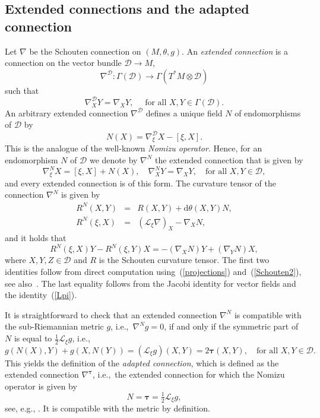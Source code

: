 \documentclass{amsart}
\theoremstyle{plain}
\theoremstyle{definition}
\newcommand{\bt}{{\boldsymbol{\tau}}}
\newcommand{\1}{\mathbf{1}}
\newcommand{\D}{{\mathcal D}}
\renewcommand{\d}{\mathrm{d}}
\renewcommand{\L}{{\mathcal L}}
\newcommand{\+}{\oplus}
\newcommand{\N}{N}
\begin{document}
\subsection{Extended connections and the adapted connection} Let $\nabla $ be the Schouten connection on $(M,\theta,g)$.
An {\it extended connection} is a connection on the vector bundle $\D\to M$, 
$$\nabla^\D:\Gamma(\D)\longrightarrow  \Gamma(T^*M\otimes \D)$$ such that $$\nabla^\D_XY=\nabla_XY,\quad  \text{ for all $X,Y\in\Gamma(\D)$.}$$   
An arbitrary extended connection $\nabla^\D$  defines a unique  field $ \N$ of endomorphisms of $\D$ by 
\[\N(X)=\nabla^\D_\xi X-[\xi,X ].\] 
This is the analogue of the well-known {\em Nomizu operator}.
Hence,  for an endomorphism $\N $ of $\D$ we denote  by $\nabla^\N$ the  extended connection  
that is given by
\begin{equation}\label{nablaN} 
\nabla^{\N}_\xi X=[\xi,X]+\N(X),\quad \nabla^{\N}_XY=\nabla_XY,\quad\text{for all } X,Y\in\D,
\end{equation} 
and every extended connection is of this form.
The curvature tensor of the connection $\nabla^{\N}$ is given by
\begin{eqnarray}
\label{RNXY} R^\N (X,Y)&=&R(X,Y)+\d\theta(X,Y)\N ,\\
\label{RNxiX}
R^\N(\xi,X)&=&(\mathcal{L}_\xi\nabla)_X-\nabla_X\N,
\end{eqnarray}
and it holds that
\begin{equation}
\label{RxiXYYX}
R^\N(\xi,X)Y-R^\N(\xi, Y)X=-(\nabla_X\N)Y+(\nabla_Y\N) X,\end{equation}
where $X,Y,Z\in \D$ and $R$ is the Schouten curvature tensor. The first two identities follow from direct computation using~(\ref{projections}) and~(\ref{Schouten2}), see also~\cite{Papa2016}. 
The last equality follows from the Jacobi identity for vector fields and the identity~(\ref{Lpi}).

It is straightforward to check that an extended connection $\nabla^\N$ is compatible with the sub-Riemannian metric $g$, i.e.,~$\nabla^\N g=0$, if and only if the symmetric part of $\N$ is equal to $\frac12 \L_\xi g$, i.e.,
\begin{equation}\label{defA1} 
g(\N(X),Y)+g(X,\N(Y))=(\mathcal{L}_\xi g)(X,Y) =2\bt(X,Y),\quad \text{for all } X,Y\in\D.\end{equation}
This yields the definition of the 
 {\em adapted connection}, which is defined as the extended connection $\nabla^\bt$, i.e.,~the extended connection for which the Nomizu operator is given by \[\N=\bt=\tfrac12\L_\xi g,\] see, e.g., \cite{FG,FGR}. It is compatible with the metric by definition.
\end{document}
